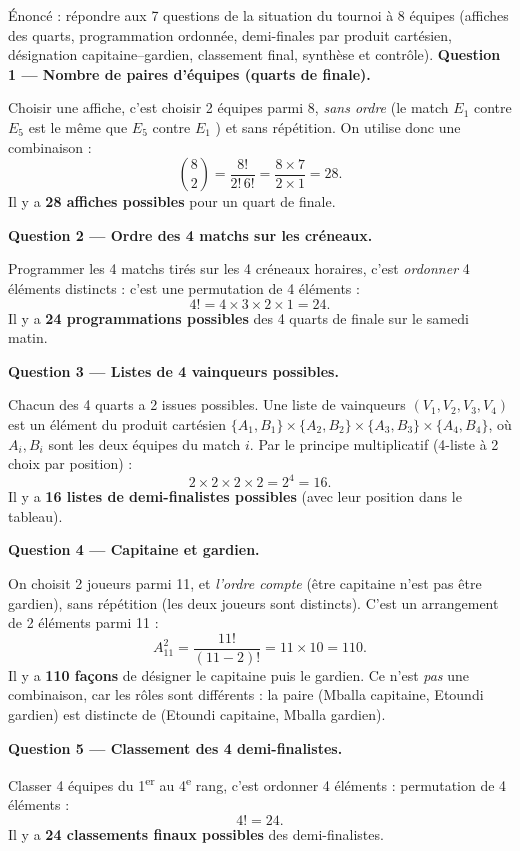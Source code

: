\documentclass[11pt]{article}
\newcommand{\cle}[1]{{\popxbold\color{popdark}#1}}
\newcounter{popsec}
\newcounter{popsub}
\newcommand{\courssub}[1]{%
  \stepcounter{popsub}%
  \par\vspace{9pt}\noindent{\popxbold\fontsize{11.5}{13}\selectfont\color{popink}{\color{poporange}\thepopsec.\thepopsub}\hspace{6pt}#1}\par\nopagebreak\vspace{4pt}
}
\begin{document}
\courssub{Démarche et corrigé commenté}

\begin{exoresolu}
Énoncé : répondre aux 7 questions de la situation du tournoi à 8 équipes (affiches des quarts, programmation ordonnée, demi-finales par produit cartésien, désignation capitaine--gardien, classement final, synthèse et contrôle).
\tcblower
\textbf{Question 1 — Nombre de paires d'équipes (quarts de finale).}\par
Choisir une affiche, c'est choisir 2 équipes parmi 8, \emph{sans ordre} (le match \og $E_1$ contre $E_5$ \fg{} est le même que \og $E_5$ contre $E_1$ \fg) et sans répétition. On utilise donc une \cle{combinaison} :
\[
\binom{8}{2} = \frac{8!}{2!\,6!} = \frac{8 \times 7}{2 \times 1} = 28.
\]
Il y a \textbf{28 affiches possibles} pour un quart de finale.

\textbf{Question 2 — Ordre des 4 matchs sur les créneaux.}\par
Programmer les 4 matchs tirés sur les 4 créneaux horaires, c'est \emph{ordonner} 4 éléments distincts : c'est une \cle{permutation} de 4 éléments :
\[
4! = 4 \times 3 \times 2 \times 1 = 24.
\]
Il y a \textbf{24 programmations possibles} des 4 quarts de finale sur le samedi matin.

\textbf{Question 3 — Listes de 4 vainqueurs possibles.}\par
Chacun des 4 quarts a 2 issues possibles. Une liste de vainqueurs $(V_1, V_2, V_3, V_4)$ est un élément du \cle{produit cartésien} $\{A_1, B_1\} \times \{A_2, B_2\} \times \{A_3, B_3\} \times \{A_4, B_4\}$, où $A_i, B_i$ sont les deux équipes du match $i$. Par le principe multiplicatif (4-liste à 2 choix par position) :
\[
2 \times 2 \times 2 \times 2 = 2^4 = 16.
\]
Il y a \textbf{16 listes de demi-finalistes possibles} (avec leur position dans le tableau).

\textbf{Question 4 — Capitaine et gardien.}\par
On choisit 2 joueurs parmi 11, et \emph{l'ordre compte} (être capitaine n'est pas être gardien), sans répétition (les deux joueurs sont distincts). C'est un \cle{arrangement} de 2 éléments parmi 11 :
\[
A_{11}^2 = \frac{11!}{(11-2)!} = 11 \times 10 = 110.
\]
Il y a \textbf{110 façons} de désigner le capitaine puis le gardien. Ce n'est \emph{pas} une combinaison, car les rôles sont différents : la paire (Mballa capitaine, Etoundi gardien) est distincte de (Etoundi capitaine, Mballa gardien).

\textbf{Question 5 — Classement des 4 demi-finalistes.}\par
Classer 4 équipes du 1\textsuperscript{er} au 4\textsuperscript{e} rang, c'est ordonner 4 éléments : \cle{permutation} de 4 éléments :
\[
4! = 24.
\]
Il y a \textbf{24 classements finaux possibles} des demi-finalistes.


\end{exoresolu}
\end{document}

